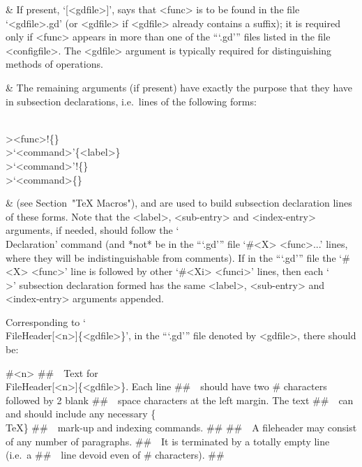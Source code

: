 &
If present, `[<gdfile>]', says that <func> is to be  found  in  the  file
`<gdfile>.gd' (or <gdfile> if <gdfile> already contains a suffix); it  is
required only if <func> appears in more than one of the  ```.gd'''  files
listed in the file  <configfile>.  The  <gdfile>  argument  is  typically
required for distinguishing methods of operations.

&
The remaining arguments (if present) have exactly the purpose  that  they
have  in subsection   declarations, i.e.~lines of the following forms:

\)\\><func>!\{<sub-entry>\}
\)\\>\lq<command>\rq\{<label>\}
\)\\>\lq<command>\rq!\{<sub-entry>\}
\)\\>\lq<command>\rq@\{<index-entry>\}

&
(see Section~"TeX Macros"), and are used to build subsection  declaration
lines  of  these  forms.  Note  that   the   <label>,   <sub-entry>   and
<index-entry> arguments, if needed,  should  follow  the  `\\Declaration'
command (and *not* be in the  ```.gd'''  file  `\#<X>  <func>...'  lines,
where they will be indistinguishable from comments). If in the  ```.gd'''
file the `\#<X> <func>' line is followed by other `\#<Xi> <funci>' lines,
then each `\\>' subsection  declaration  formed  has  the  same  <label>,
<sub-entry> and <index-entry> arguments appended.

\enditems

Corresponding to `\\FileHeader[<n>]\{<gdfile>\}', in the  ```.gd'''  file
denoted by <gdfile>, there should be:

\)\#<n>
\)\#\#\ \ Text for \\FileHeader[<n>]\{<gdfile>\}. Each line
\)\#\#\ \ should have two \# characters followed by 2 blank
\)\#\#\ \ space characters at the left margin. The text
\)\#\#\ \ can and should include any necessary \{\\TeX\}
\)\#\#\ \ mark-up and indexing commands.
\)\#\#
\)\#\#\ \ A fileheader may consist of any number of paragraphs.
\)\#\#\ \ It is terminated by a totally empty line (i.e.~a
\)\#\#\ \ line devoid even of \# characters).
\)\#\#

